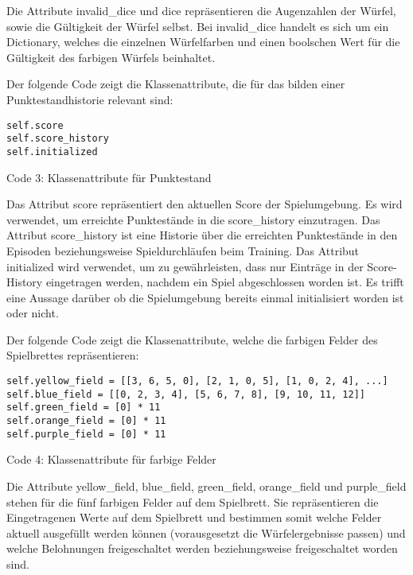 Die Attribute invalid\_dice und dice repräsentieren die Augenzahlen der Würfel, sowie die Gültigkeit der Würfel selbst. Bei invalid\_dice handelt es sich um ein Dictionary, welches die einzelnen Würfelfarben und einen boolschen Wert für die Gültigkeit des farbigen Würfels beinhaltet.\\

\begin{minipage}{\linewidth}
Der folgende Code zeigt die Klassenattribute, die für das bilden einer Punktestandhistorie relevant sind:
\vspace{0.5cm}
\begin{lstlisting}
self.score
self.score_history
self.initialized
\end{lstlisting}
Code 3: Klassenattribute für Punktestand\\
\end{minipage}

Das Attribut score repräsentiert den aktuellen Score der Spielumgebung. Es wird verwendet, um erreichte Punktestände in die score\_history einzutragen. Das Attribut score\_history ist eine Historie über die erreichten Punktestände in den Episoden beziehungsweise Spieldurchläufen beim Training. Das Attribut initialized wird verwendet, um zu gewährleisten, dass nur Einträge in der Score-History eingetragen werden, nachdem ein Spiel abgeschlossen worden ist. Es trifft eine Aussage darüber ob die Spielumgebung bereits einmal initialisiert worden ist oder nicht.\\

\begin{minipage}{\linewidth}
Der folgende Code zeigt die Klassenattribute, welche die farbigen Felder des Spielbrettes repräsentieren:
\vspace{0.5cm}
\begin{lstlisting}
self.yellow_field = [[3, 6, 5, 0], [2, 1, 0, 5], [1, 0, 2, 4], ...]
self.blue_field = [[0, 2, 3, 4], [5, 6, 7, 8], [9, 10, 11, 12]]
self.green_field = [0] * 11
self.orange_field = [0] * 11
self.purple_field = [0] * 11
\end{lstlisting}
Code 4: Klassenattribute für farbige Felder\\
\end{minipage}

Die Attribute yellow\_field, blue\_field, green\_field, orange\_field und purple\_field stehen für die fünf farbigen Felder auf dem Spielbrett. Sie repräsentieren die Eingetragenen Werte auf dem Spielbrett und bestimmen somit welche Felder aktuell ausgefüllt werden können (vorausgesetzt die Würfelergebnisse passen) und welche Belohnungen freigeschaltet werden beziehungsweise freigeschaltet worden sind.\\

